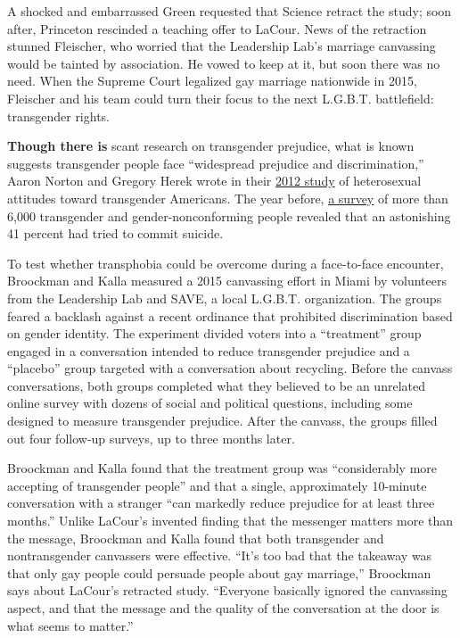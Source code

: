 A shocked and embarrassed Green requested that Science retract the
study; soon after, Princeton rescinded a teaching offer to LaCour. News
of the retraction stunned Fleischer, who worried that the Leadership
Lab's marriage canvassing would be tainted by association. He vowed to
keep at it, but soon there was no need. When the Supreme Court legalized
gay marriage nationwide in 2015, Fleischer and his team could turn their
focus to the next L.G.B.T. battlefield: transgender rights.

\textbf{Though there is} scant research on transgender prejudice, what
is known suggests transgender people face ``widespread prejudice and
discrimination,'' Aaron Norton and Gregory Herek wrote in their
\href{http://pscresearch.faculty.ucdavis.edu/wp-content/uploads/sites/112/2014/09/Herek-hetero-attitude-transgender-1012.pdf}{2012
study} of heterosexual attitudes toward transgender Americans. The year
before,
\href{http://endtransdiscrimination.org/PDFs/NTDS_Exec_Summary.pdf}{a
survey} of more than 6,000 transgender and gender-nonconforming people
revealed that an astonishing 41 percent had tried to commit suicide.

To test whether transphobia could be overcome during a face-to-face
encounter, Broockman and Kalla measured a 2015 canvassing effort in
Miami by volunteers from the Leadership Lab and SAVE, a local L.G.B.T.
organization. The groups feared a backlash against a recent ordinance
that prohibited discrimination based on gender identity. The experiment
divided voters into a ``treatment'' group engaged in a conversation
intended to reduce transgender prejudice and a ``placebo'' group
targeted with a conversation about recycling. Before the canvass
conversations, both groups completed what they believed to be an
unrelated online survey with dozens of social and political questions,
including some designed to measure transgender prejudice. After the
canvass, the groups filled out four follow-up surveys, up to three
months later.

Broockman and Kalla found that the treatment group was ``considerably
more accepting of transgender people'' and that a single, approximately
10-minute conversation with a stranger ``can markedly reduce prejudice
for at least three months.'' Unlike LaCour's invented finding that the
messenger matters more than the message, Broockman and Kalla found that
both transgender and nontransgender canvassers were effective. ``It's
too bad that the takeaway was that only gay people could persuade people
about gay marriage,'' Broockman says about LaCour's retracted study.
``Everyone basically ignored the canvassing aspect, and that the message
and the quality of the conversation at the door is what seems to
matter.''

